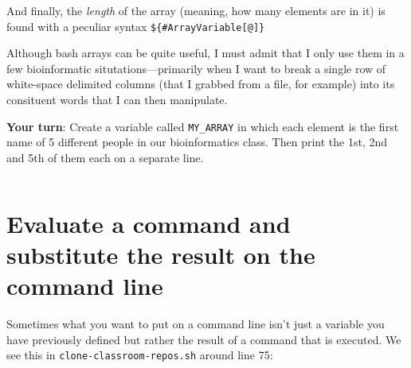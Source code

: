 \documentclass[]{krantz}
\makeatletter
\newenvironment{Shaded}{\begin{snugshade}}{\end{snugshade}}
\newcommand{\BuiltInTok}[1]{#1}
\newcommand{\CommentTok}[1]{\textcolor[rgb]{0.37,0.37,0.37}{\textit{#1}}}
\newcommand{\ExtensionTok}[1]{#1}
\newcommand{\NormalTok}[1]{#1}
\newcommand{\VariableTok}[1]{\textcolor[rgb]{0,0,0}{#1}}
\newenvironment{kframe}{%
\medskip{}
\setlength{\fboxsep}{.8em}
 \def\at@end@of@kframe{}%
 \ifinner\ifhmode%
  \def\at@end@of@kframe{\end{minipage}}%
  \begin{minipage}{\columnwidth}%
 \fi\fi%
 \def\FrameCommand##1{\hskip\@totalleftmargin \hskip-\fboxsep
 \colorbox{shadecolor}{##1}\hskip-\fboxsep
     \hskip-\linewidth \hskip-\@totalleftmargin \hskip\columnwidth}%
 \MakeFramed {\advance\hsize-\width
   \@totalleftmargin\z@ \linewidth\hsize
   \@setminipage}}%
 {\par\unskip\endMakeFramed%
 \at@end@of@kframe}
\renewenvironment{Shaded}{\begin{kframe}}{\end{kframe}}
\makeatother
\begin{document}
\begin{Shaded}
\end{Shaded}

And finally, the \emph{length} of the array (meaning, how many elements
are in it) is found with a peculiar syntax \texttt{\$\{\#ArrayVariable{[}@{]}\}}

\begin{Shaded}
\end{Shaded}

Although bash arrays can be quite useful, I must admit that I only
use them in a few bioinformatic situtations---primarily when I want
to break a single row of white-space delimited columns (that I grabbed
from a file, for example) into its consituent words that I can
then manipulate.

\textbf{Your turn}: Create a variable called \texttt{MY\_ARRAY} in which each
element is the first name of 5 different people in our bioinformatics class.
Then print the 1st, 2nd and 5th of them each on a separate line.

\begin{verbatim}
\end{verbatim}

\hypertarget{evaluate-a-command-and-substitute-the-result-on-the-command-line}{%
\section{Evaluate a command and substitute the result on the command line}\label{evaluate-a-command-and-substitute-the-result-on-the-command-line}}

Sometimes what you want to put on a command line isn't just a variable
you have previously defined but rather the result of a command that
is executed. We see this in \texttt{clone-classroom-repos.sh} around line 75:
\end{document}
